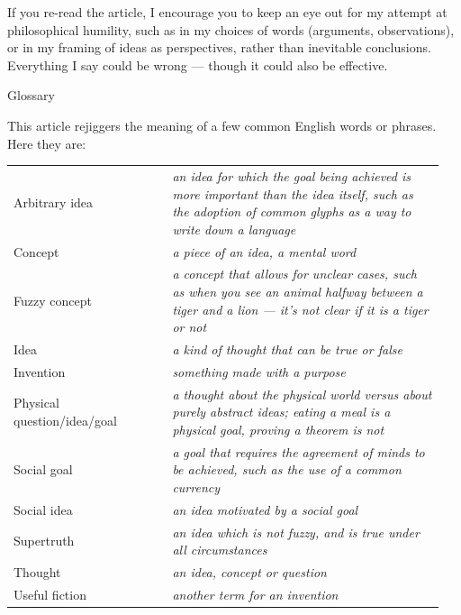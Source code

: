 \documentclass[11pt, oneside]{article}
\begin{document}
If you re-read the article, I encourage you to keep an eye out for my attempt at
philosophical humility, such as in my choices of words (arguments,
observations), or in my framing of ideas as perspectives, rather than inevitable
conclusions.
Everything I say could be wrong --- though it could also be effective.


\pagebreak

{\huge Glossary}
\bigskip

This article rejiggers the meaning of a few common English words or phrases.
Here they are:

\renewcommand{\arraystretch}{2}
\begin{center}
    \begin{tabular}{p{0.35\linewidth} | p{0.6\linewidth}}
        \hfill
        Arbitrary idea & \em an idea for which the goal being achieved
                             is more important than the idea itself, such as the
                             adoption of common glyphs as a way to write down a
                             language \\
        \hfill
        Concept        & \em a piece of an idea, a mental word \\
        \hfill
        Fuzzy concept  & \em a concept that allows for unclear cases, such
                             as when you see an animal halfway between a tiger
                             and a lion --- it's not clear if it is a tiger or
                             not \\
        \hfill
        Idea           & \em a kind of thought that can be true or false \\
        \hfill
        Invention      & \em something made with a purpose \\
        \hfill
        Physical question/idea/goal & \em a thought about the physical world
                             versus about purely abstract ideas; eating a meal
                             is a physical goal, proving a theorem is not \\
        \hfill
        Social goal    & \em a goal that requires the agreement of minds to be
                             achieved, such as the use of a common currency \\
        \hfill
        Social idea    & \em an idea motivated by a social goal \\
        \hfill
        Supertruth     & \em an idea which is not fuzzy, and is true under all
                             circumstances \\
        \hfill
        Thought        & \em an idea, concept or question \\
        \hfill
        Useful fiction & \em another term for an invention \\
    \end{tabular}
\end{center}
\end{document}
